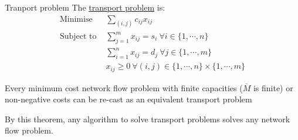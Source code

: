 \documentclass[../Main.tex]{subfiles}
\begin{document}
\begin{definition}{Tranport problem}
    The \underline{transport problem} is:
    \begin{align*}
        \text{Minimise } &\sum_{(i, j)} c_{ij} x_{ij} \\
        \text{Subject to } &\sum_{j = 1}^m  x_{ij} = s_i~\forall i \in \{1, \cdots, n\} \\
        &\sum_{i = 1}^n x_{ij} = d_j~\forall j \in \{1, \cdots, m\} \\
        & x_{ij} \geq 0~\forall (i, j) \in \{1, \cdots, n\} \times \{1, \cdots, m\}
    \end{align*}
\end{definition}
\begin{theorem}
    Every minimum cost network flow problem with finite capacities ($\overline{M}$ is finite) or non-negative costs can be re-cast as an equivalent transport problem
    \label{thmFlowTransportEquiv}
\end{theorem}
\begin{remark}
    By this theorem, any algorithm to solve transport problems solves any network flow problem.
\end{remark}
\end{document}
